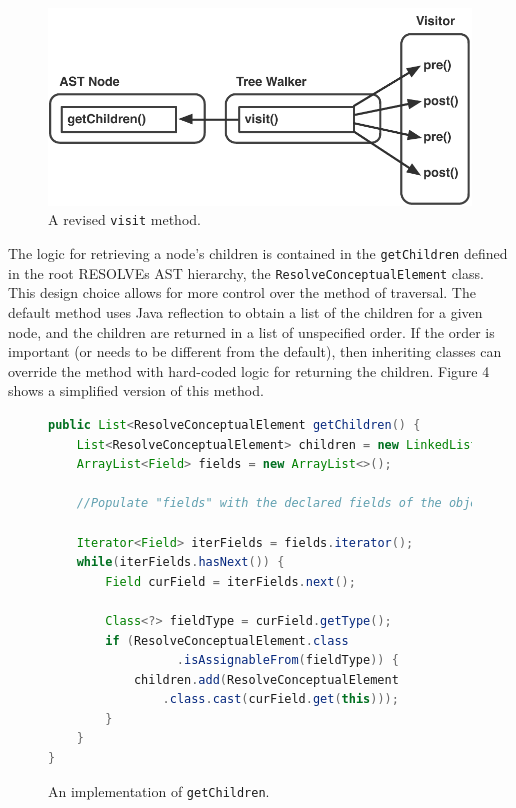 \documentclass[times]{speauth}
\begin{document}
\begin{figure}[!htb]
\centering
\includegraphics[scale=.60]{figures/prepostprepost.pdf}
\caption{A revised \texttt{visit} method.}
\end{figure}

The logic for retrieving a node's children is contained in the \texttt{getChildren} defined in the root RESOLVEs AST hierarchy, the \texttt{ResolveConceptualElement} class. This design choice allows for more control over the method of traversal. The default method uses Java reflection to obtain a list of the children for a given node, and the children are returned in a list of unspecified order. If the order is important (or needs to be different from the default), then inheriting classes can override the method with hard-coded logic for returning the children. Figure 4 shows a simplified version of this method.

\begin{figure}[!htb]
\centering
\begin{minipage}{.80\textwidth}
\begin{lstlisting}[language=java]
public List<ResolveConceptualElement getChildren() {
    List<ResolveConceptualElement> children = new LinkedList<>();
    ArrayList<Field> fields = new ArrayList<>();
    
    //Populate "fields" with the declared fields of the object's defining class
    
    Iterator<Field> iterFields = fields.iterator();
    while(iterFields.hasNext()) {
        Field curField = iterFields.next();
        
        Class<?> fieldType = curField.getType();
        if (ResolveConceptualElement.class
                  .isAssignableFrom(fieldType)) {
            children.add(ResolveConceptualElement
                .class.cast(curField.get(this)));
        }
    }
}
\end{lstlisting}
\end{minipage}
\caption{An implementation of \texttt{getChildren}.}
\label{fig:getchildren}
\end{figure}
\end{document}
